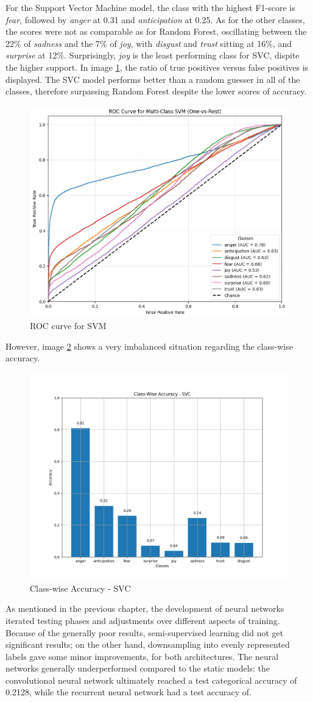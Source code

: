 For the Support Vector Machine model, the class with the highest F1-score is \textit{fear}, followed by \textit{anger} at 0.31 and \textit{anticipation} at 0.25. As for the other classes, the scores were not as comparable as for Random Forest, oscillating between the 22\% of \textit{sadness} and the 7\% of \textit{joy}, with \textit{disgust} and \textit{trust} sitting at 16\%, and \textit{surprise} at 12\%. Surprisingly, \textit{joy} is the least performing class for SVC, dispite the higher support.   
In image \ref{fig:roc_svc}, the ratio of true positives versus false positives is displayed. The SVC model performs better than a random guesser in all of the classes, therefore surpassing Random Forest despite the lower scores of accuracy. 

\begin{figure}[!h]
    \centering
    \includegraphics[width=0.5\linewidth]{pictures/roc_svc.png}
    \caption{ROC curve for SVM}
    \label{fig:roc_svc}
\end{figure}
However, image \ref{fig:acc_svc} shows a very imbalanced situation regarding the class-wise accuracy.
\begin{figure}
      \centering
      \includegraphics[width=0.5\linewidth]{pictures/class_accuracy_SVC.png}
      \caption{Class-wise Accuracy - SVC}
      \label{fig:acc_svc}
\end{figure}


As mentioned in the previous chapter, the development of neural networks
iterated testing phases and adjustments over different aspects of training.
Because of the generally poor results, semi-supervised learning did not get
significant results; on the other hand, downsampling into evenly represented
labels gave some minor improvements, for both architectures.
The neural networks generally underperformed compared to the static models:
the convolutional neural network ultimately reached a test categorical accuracy
of 0.2128, while the recurrent neural network had a test accuracy of.\\

